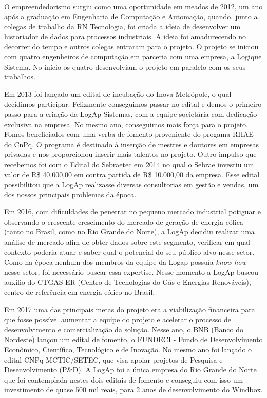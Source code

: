 
\label{Cap:trajetoriaFormacaoCINO}

O empreendedorismo surgiu como uma oportunidade em meados de 2012, um ano após a graduação em Engenharia de Computação e Automação, quando, junto a colegas de trabalho da RN Tecnologia, foi criada a ideia de desenvolver um historiador de dados para processos industriais. A ideia foi amadurecendo no decorrer do tempo e outros colegas entraram para o projeto. O projeto se iniciou com quatro engenheiros de computação em parceria com uma empresa, a Logique Sistema. No início os quatro desenvolviam o projeto em paralelo com os seus trabalhos. 

Em 2013 foi lançado um edital de incubação do Inova Metrópole, o qual decidimos participar. Felizmente conseguimos passar no edital e demos o primeiro passo para a criação da LogAp Sistemas, com a equipe societária com dedicação exclusiva na empresa. No mesmo ano, conseguimos mais força para o projeto. Fomos beneficiados com uma verba de fomento proveniente do progama RHAE do CnPq. O programa é destinado à inserção de mestres e doutores em empresas privadas e nos proporcionou inserir mais talentos no projeto. Outro impulso que recebemos foi com o Edital do Sebraetec em 2014 no qual o Sebrae investiu um valor de R\$ 40.000,00 em contra partida de R\$ 10.000,00 da empresa. Esse edital possibilitou que a LogAp realizasse diversas consultorias em gestão e vendas, um dos nossos principais problemas da época.

Em 2016, com dificuldades de penetrar no pequeno mercado industrial potiguar e observando o crescente crescimento do mercado de geração de energia eólica (tanto no Brasil, como no Rio Grande do Norte), a LogAp decidiu realizar uma análise de mercado afim de obter dados sobre este segmento, verificar em qual contexto poderia atuar e saber qual o potencial do seu público-alvo nesse setor. Como na época nenhum dos membros da equipe da Logap possuía \textit{know-how} nesse setor, foi necessário buscar essa expertise. Nesse momento a LogAp buscou auxilio do CTGAS-ER (Centro de Tecnologias do Gás e Energias Renováveis), centro de referência em energia eólico no Brasil. 

Em 2017 uma das principais metas do projeto era a viabilização financeira para que fosse possível aumentar a equipe do projeto e acelerar o processo de desenvolvimento e comercialização da solução. Nesse ano, o BNB (Banco do Nordeste) lançou um edital de fomento, o FUNDECI - Fundo de Desenvolvimento Econômico, Científico, Tecnológico e de Inovação. No mesmo ano foi lançado o edital CNPq MCTIC/SETEC, que visa apoiar projetos de Pesquisa e Desenvolvimento (P\&D). A LogAp foi a única empresa do Rio Grande do Norte que foi contemplada nestes dois editais de fomento e conseguiu com isso um investimento de quase 500 mil reais, para 2 anos de desenvolvimento do Windbox. 

